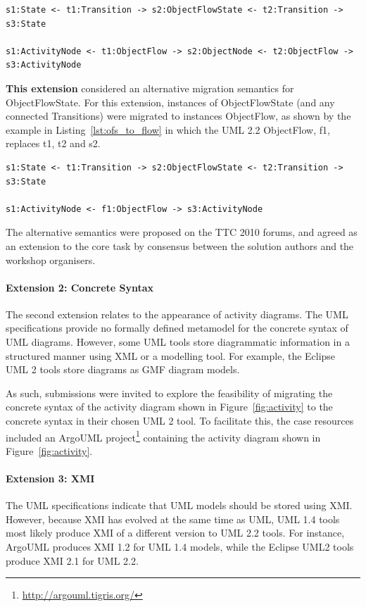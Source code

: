 \begin{lstlisting}[caption=Migrating Actions, label=lst:ofs_to_node]
s1:State <- t1:Transition -> s2:ObjectFlowState <- t2:Transition -> s3:State

s1:ActivityNode <- t1:ObjectFlow -> s2:ObjectNode <- t2:ObjectFlow -> s3:ActivityNode
\end{lstlisting}

\textbf{This extension} considered an alternative migration semantics for ObjectFlowState. For this extension, instances of ObjectFlowState (and any connected Transitions) were migrated to instances ObjectFlow, as shown by the example in Listing~\ref{lst:ofs_to_flow} in which the UML 2.2 ObjectFlow, f1, replaces t1, t2 and s2.

\begin{lstlisting}[caption=Migrating Actions, label=lst:ofs_to_flow]
s1:State <- t1:Transition -> s2:ObjectFlowState <- t2:Transition -> s3:State

s1:ActivityNode <- f1:ObjectFlow -> s3:ActivityNode
\end{lstlisting}

The alternative semantics were proposed on the TTC 2010 forums, and agreed as an extension to the core task by consensus between the solution authors and the workshop organisers. 

\paragraph{Extension 2: Concrete Syntax}
\label{sub:concrete_syntax}
The second extension relates to the appearance of activity diagrams. The UML specifications provide no formally defined metamodel for the concrete syntax of UML diagrams. However, some UML tools store diagrammatic information in a structured manner using XML or a modelling tool. For example, the Eclipse UML 2 tools \cite{mdt_uml2} store diagrams as GMF \cite{gronback09emp} diagram models.

As such, submissions were invited to explore the feasibility of migrating the concrete syntax of the activity diagram shown in Figure~\ref{fig:activity} to the concrete syntax in their chosen UML 2 tool. To facilitate this, the case resources included an ArgoUML project\footnote{\url{http://argouml.tigris.org/}} containing the activity diagram shown in Figure~\ref{fig:activity}.

\paragraph{Extension 3: XMI}
\label{sub:xmi}
The UML specifications indicate that UML models should be stored using XMI. However, because XMI has evolved at the same time as UML, UML 1.4 tools most likely produce XMI of a different version to UML 2.2 tools. For instance, ArgoUML produces XMI 1.2 for UML 1.4 models, while the Eclipse UML2 tools produce XMI 2.1 for UML 2.2.

